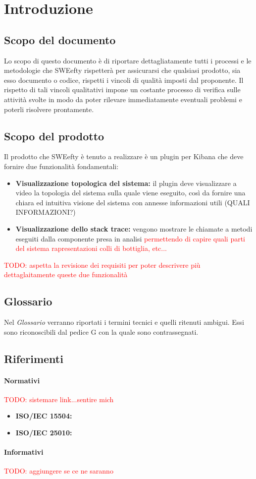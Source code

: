 \section{Introduzione}
	\subsection{Scopo del documento}
	Lo scopo di questo documento è di riportare dettagliatamente tutti i processi e le metodologie che SWEefty rispetterà per assicurarsi che qualsiasi prodotto, sia esso documento o codice, rispetti i vincoli di qualità imposti dal proponente.
	Il rispetto di tali vincoli qualitativi impone un costante processo di verifica sulle attività svolte in modo da poter rilevare immediatamente eventuali problemi e poterli risolvere prontamente.
	\subsection{Scopo del prodotto}
	Il prodotto che SWEefty è tenuto a  realizzare è un plugin per Kibana che deve fornire due funzionalità fondamentali:
	\begin{itemize}
		\item \textbf{Visualizzazione topologica del sistema:} il plugin deve visualizzare a video la topologia del sistema sulla quale viene eseguito, così da fornire una chiara ed intuitiva visione del sistema con annesse informazioni utili (QUALI INFORMAZIONI?)
		\item \textbf{Visualizzazione dello stack trace:} vengono mostrare le chiamate a metodi eseguiti dalla componente presa in analisi \textcolor{red}{permettendo di capire quali parti del sistema rapresentazioni colli di bottiglia, etc...}
	\end{itemize}
		\textcolor{red}{TODO: aspetta la revisione dei requisiti per poter descrivere più dettaglaitamente queste due funzionalità}
	\subsection{Glossario}
	Nel \emph{Glossario} verranno riportati i termini tecnici e quelli ritenuti ambigui. Essi sono riconoscibili dal pedice G con la quale sono contrassegnati.
	\subsection{Riferimenti}
		\paragraph{Normativi}
		\textcolor{red}{TODO: sistemare link...sentire mich}
			\begin{itemize}
				\item \textbf{ISO/IEC 15504:}
				\item \textbf{ISO/IEC 25010:}
			\end{itemize}

		\paragraph{Informativi}
		\textcolor{red}{TODO: aggiungere se ce ne saranno}